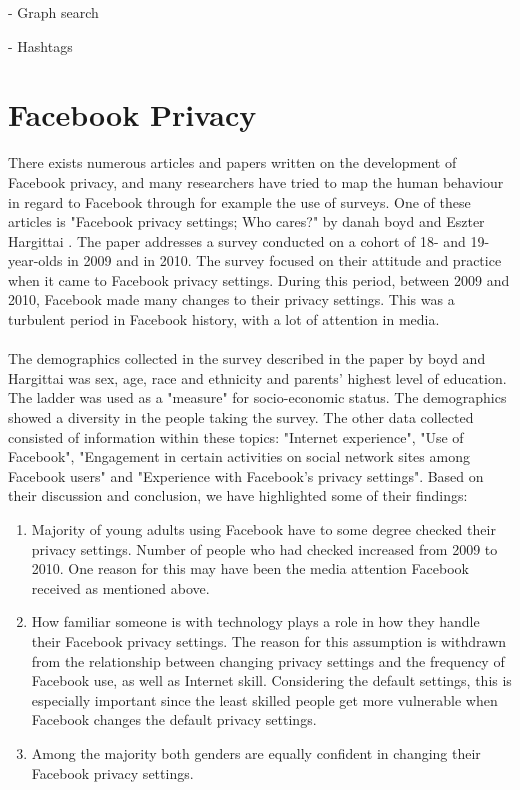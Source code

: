 - Graph search

- Hashtags

\section{Facebook Privacy}
\label{sec:relatedwork_facebookprivacy}
There exists numerous articles and papers written on the development of Facebook privacy, and many researchers have tried to map the human behaviour in regard to Facebook through for example the use of surveys. One of these articles is "Facebook privacy settings; Who cares?" by danah boyd and Eszter Hargittai \cite{whocares}. The paper addresses a survey conducted on a cohort of 18- and 19-year-olds in 2009 and in 2010. The survey focused on their attitude and practice when it came to Facebook privacy settings. During this period, between 2009 and 2010, Facebook made many changes to their privacy settings. This was a turbulent period in Facebook history, with a lot of attention in media.

\paragraph{}
The demographics collected in the survey described in the paper by boyd and Hargittai was sex, age, race and ethnicity and parents' highest level of education. The ladder was used as a "measure" for socio-economic status. The demographics showed a diversity in the people taking the survey. The other data collected consisted of information within these topics: "Internet experience", "Use of Facebook", "Engagement in certain activities on social network sites among Facebook users" and "Experience with Facebook's privacy settings". Based on their discussion and conclusion, we have highlighted some of their findings: 

\begin{enumerate}
\item Majority of young adults using Facebook have to some degree checked their privacy settings. Number of people who had checked increased from 2009 to 2010. One reason for this may have been the media attention Facebook received as mentioned above. 
\item How familiar someone is with technology plays a role in how they handle their Facebook privacy settings. The reason for this assumption is withdrawn from the relationship between changing privacy settings and the frequency of Facebook use, as well as Internet skill. Considering the default settings, this is especially important since the least skilled people get more vulnerable when Facebook changes the default privacy settings. 
\item Among the majority both genders are equally confident in changing their Facebook privacy settings. 
\end{enumerate}

